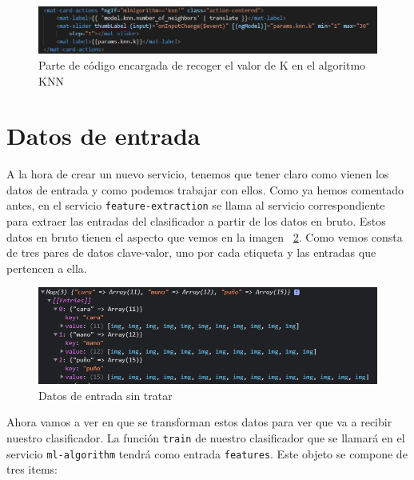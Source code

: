 \documentclass[a4paper, 12pt]{book}
\begin{document}
\begin{figure}
	\centering
	\includegraphics[width=12cm, keepaspectratio]{img/nvecinosknn}
	\caption{Parte de código encargada de recoger el valor de K en el algoritmo KNN}				
        \label{fig:nvecinosknn}
\end{figure}

\section{Datos de entrada} 
\label{sec:datosdeentrada}

A la hora de crear un nuevo servicio, tenemos que tener claro como vienen los datos de entrada y como podemos trabajar con ellos. Como ya hemos comentado antes, en el servicio \texttt{feature-extraction} se llama al servicio correspondiente para extraer las entradas del clasificador a partir de los datos en bruto. Estos datos en bruto tienen el aspecto que vemos en la imagen ~\ref{fig:datosenbruto}. Como vemos consta de tres pares de datos clave-valor, uno por cada etiqueta y las entradas que pertencen a ella.

\begin{figure}
	\centering
	\includegraphics[width=12cm, keepaspectratio]{img/datosenbruto}
	\caption{Datos de entrada sin tratar}				
	\label{fig:datosenbruto}
\end{figure}

Ahora vamos a ver en que se transforman estos datos para ver que va a recibir nuestro clasificador. La función \texttt{train} de nuestro clasificador que se llamará en el servicio \texttt{ml-algorithm} tendrá como entrada \texttt{features}. Este objeto se compone de tres items:
\end{document}
